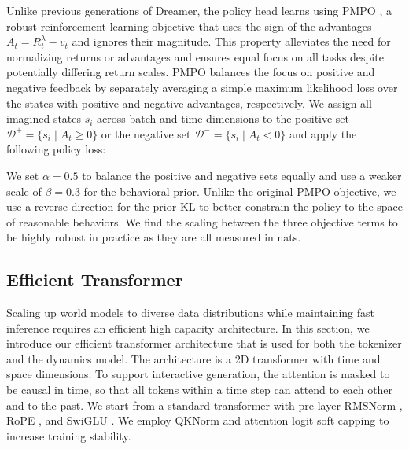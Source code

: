 \documentclass[11pt]{article}
\begin{document}

Unlike previous generations of Dreamer, the policy head learns using PMPO \citep{abdolmaleki2024pmpo}, a robust reinforcement learning objective that uses the sign of the advantages $A_t = R^\lambda_t-v_t$ and ignores their magnitude.
This property alleviates the need for normalizing returns or advantages and ensures equal focus on all tasks despite potentially differing return scales.
PMPO balances the focus on positive and negative feedback by separately averaging a simple maximum likelihood loss over the states with positive and negative advantages, respectively.
We assign all imagined states $s_i$ across batch and time dimensions to the positive set $\mathcal{D}^+=\{s_i \mid A_t \geq 0\}$ or the negative set $\mathcal{D}^-=\{s_i \mid A_t < 0\}$ and apply the following policy loss:


We set $\alpha=0.5$ to balance the positive and negative sets equally and use a weaker scale of $\beta=0.3$ for the behavioral prior.
Unlike the original PMPO objective, we use a reverse direction for the prior KL to better constrain the policy to the space of reasonable behaviors.
We find the scaling between the three objective terms to be highly robust in practice as they are all measured in nats\citep{shannon1948infotheory}.

\subsection{Efficient Transformer}

Scaling up world models to diverse data distributions while maintaining fast inference requires an efficient high capacity architecture.
In this section, we introduce our efficient transformer architecture that is used for both the tokenizer and the dynamics model.
The architecture is a 2D transformer \citep{vaswani2017transformer} with time and space dimensions.
To support interactive generation, the attention is masked to be causal in time, so that all tokens within a time step can attend to each other and to the past.
We start from a standard transformer with pre-layer RMSNorm \citep{rmsnorm}, RoPE \citep{rope}, and SwiGLU \citep{swiglu}.
We employ QKNorm \citep{dehghani2023scaling} and attention logit soft capping \citep{bello2016neural,gemma2} to increase training stability.
\end{document}
